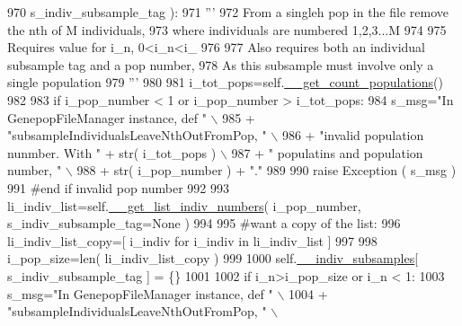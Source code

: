 \begin{DoxyCode}
970                                                     s\_indiv\_subsample\_tag ):
971         \textcolor{stringliteral}{'''}
972 \textcolor{stringliteral}{        From a singleh pop in the file remove the nth of M individuals, }
973 \textcolor{stringliteral}{        where individuals are numbered 1,2,3...M}
974 \textcolor{stringliteral}{}
975 \textcolor{stringliteral}{        Requires value for i\_n, 0<i\_n<i\_}
976 \textcolor{stringliteral}{}
977 \textcolor{stringliteral}{        Also requires both an individual subsample tag and a pop number,}
978 \textcolor{stringliteral}{        As this subsample must involve only a single population}
979 \textcolor{stringliteral}{        '''}
980     
981         i\_tot\_pops=self.\hyperlink{classnegui_1_1genepopfilemanager_1_1GenepopFileManager_a51f6dcbd17c80f8e61114b11283b655f}{\_\_get\_count\_populations}()
982 
983         \textcolor{keywordflow}{if} i\_pop\_number < 1 \textcolor{keywordflow}{or} i\_pop\_number > i\_tot\_pops:
984             s\_msg=\textcolor{stringliteral}{"In GenepopFileManager instance, def "} \(\backslash\)
985                     + \textcolor{stringliteral}{"subsampleIndividualsLeaveNthOutFromPop, "} \(\backslash\)
986                     + \textcolor{stringliteral}{"invalid population nunmber.  With "} + str( i\_tot\_pops ) \(\backslash\)
987                     + \textcolor{stringliteral}{" populatins and  population number, "} \(\backslash\)
988                     + str( i\_pop\_number ) + \textcolor{stringliteral}{"."}
989 
990             \textcolor{keywordflow}{raise} Exception ( s\_msg )
991         \textcolor{comment}{#end if invalid pop number}
992 
993         li\_indiv\_list=self.\hyperlink{classnegui_1_1genepopfilemanager_1_1GenepopFileManager_a4615769e9db90aa477aa3fd865408f54}{\_\_get\_list\_indiv\_numbers}( i\_pop\_number, 
      s\_indiv\_subsample\_tag=\textcolor{keywordtype}{None} )
994 
995         \textcolor{comment}{#want a copy of the list:}
996         li\_indiv\_list\_copy=[ i\_indiv \textcolor{keywordflow}{for} i\_indiv \textcolor{keywordflow}{in} li\_indiv\_list ]
997 
998         i\_pop\_size=len( li\_indiv\_list\_copy )
999 
1000         self.\hyperlink{classnegui_1_1genepopfilemanager_1_1GenepopFileManager_a1e8379bcee4902ca9314ff53fcb71644}{\_\_indiv\_subsamples}[ s\_indiv\_subsample\_tag ] = \{\}
1001 
1002         \textcolor{keywordflow}{if} i\_n>i\_pop\_size \textcolor{keywordflow}{or} i\_n < 1:
1003             s\_msg=\textcolor{stringliteral}{"In GenepopFileManager instance, def "} \(\backslash\)
1004                     + \textcolor{stringliteral}{"subsampleIndividualsLeaveNthOutFromPop, "} \(\backslash\)

\end{DoxyCode}
